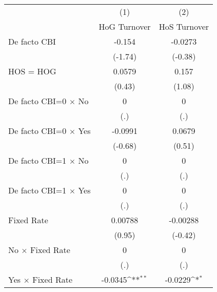 \begin{table}[htbp]\centering
\def\sym#1{\ifmmode^{#1}\else\(^{#1}\)\fi}
\caption{\label{hoshogmultIndFEDF}}
\begin{tabular}{l*{2}{c}}
\toprule
                                        &\multicolumn{1}{c}{(1)}&\multicolumn{1}{c}{(2)}\\
                                        &\multicolumn{1}{c}{HoG Turnover}&\multicolumn{1}{c}{HoS Turnover}\\
\midrule
De facto CBI                            &   -0.154         &  -0.0273         \\
                                        &  (-1.74)         &  (-0.38)         \\
\addlinespace
HOS = HOG                               &   0.0579         &    0.157         \\
                                        &   (0.43)         &   (1.08)         \\
\addlinespace
De facto CBI=0 $\times$ No              &        0         &        0         \\
                                        &      (.)         &      (.)         \\
\addlinespace
De facto CBI=0 $\times$ Yes             &  -0.0991         &   0.0679         \\
                                        &  (-0.68)         &   (0.51)         \\
\addlinespace
De facto CBI=1 $\times$ No              &        0         &        0         \\
                                        &      (.)         &      (.)         \\
\addlinespace
De facto CBI=1 $\times$ Yes             &        0         &        0         \\
                                        &      (.)         &      (.)         \\
\addlinespace
Fixed Rate                              &  0.00788         & -0.00288         \\
                                        &   (0.95)         &  (-0.42)         \\
\addlinespace
No $\times$ Fixed Rate                  &        0         &        0         \\
                                        &      (.)         &      (.)         \\
\addlinespace
Yes $\times$ Fixed Rate                 &  -0.0345\sym{**} &  -0.0229\sym{*}  \\

\end{tabular}
\end{table}
